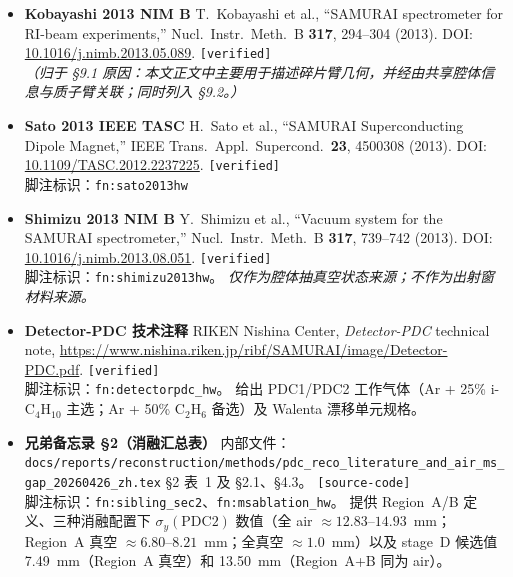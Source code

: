\documentclass[a4paper, 11pt]{article}
\begin{document}
\begin{itemize}[leftmargin=2em,itemsep=3pt]

\item \textbf{Kobayashi 2013 NIM B} \quad
T.~Kobayashi et al., ``SAMURAI spectrometer for RI-beam experiments,''
Nucl.\ Instr.\ Meth.\ B \textbf{317}, 294--304 (2013).
DOI: \href{https://doi.org/10.1016/j.nimb.2013.05.089}{10.1016/j.nimb.2013.05.089}.
\texttt{[verified]}
\\
\textit{（归于 §9.1 原因：本文正文中主要用于描述碎片臂几何，并经由共享腔体信息与质子臂关联；同时列入 §9.2。）}

\item \textbf{Sato 2013 IEEE TASC} \quad
H.~Sato et al., ``SAMURAI Superconducting Dipole Magnet,''
IEEE Trans.\ Appl.\ Supercond.\ \textbf{23}, 4500308 (2013).
DOI: \href{https://doi.org/10.1109/TASC.2012.2237225}{10.1109/TASC.2012.2237225}.
\texttt{[verified]}
\\
脚注标识：\texttt{fn:sato2013hw}

\item \textbf{Shimizu 2013 NIM B} \quad
Y.~Shimizu et al., ``Vacuum system for the SAMURAI spectrometer,''
Nucl.\ Instr.\ Meth.\ B \textbf{317}, 739--742 (2013).
DOI: \href{https://doi.org/10.1016/j.nimb.2013.08.051}{10.1016/j.nimb.2013.08.051}.
\texttt{[verified]}
\\
脚注标识：\texttt{fn:shimizu2013hw}。
\emph{仅作为腔体抽真空状态来源；不作为出射窗材料来源。}

\item \textbf{Detector-PDC 技术注释} \quad
RIKEN Nishina Center, \emph{Detector-PDC} technical note,
\url{https://www.nishina.riken.jp/ribf/SAMURAI/image/Detector-PDC.pdf}.
\texttt{[verified]}
\\
脚注标识：\texttt{fn:detectorpdc\_hw}。
给出 PDC1/PDC2 工作气体（Ar + 25\% i-C$_4$H$_{10}$ 主选；Ar + 50\% C$_2$H$_6$ 备选）及 Walenta 漂移单元规格。

\item \textbf{兄弟备忘录 §2（消融汇总表）} \quad
内部文件：\texttt{docs/reports/reconstruction/methods/pdc\_reco\_literature\_and\_air\_ms\_gap\_20260426\_zh.tex} §2 表~1 及 §2.1、§4.3。
\texttt{[source-code]}
\\
脚注标识：\texttt{fn:sibling\_sec2}、\texttt{fn:msablation\_hw}。
提供 Region~A/B 定义、三种消融配置下 $\sigma_y(\text{PDC2})$ 数值（全 air $\approx 12.83$--$14.93$~mm；Region~A 真空 $\approx 6.80$--$8.21$~mm；全真空 $\approx 1.0$~mm）以及 stage~D 候选值 7.49~mm（Region~A 真空）和 13.50~mm（Region~A+B 同为 air）。


\end{itemize}
\end{document}
